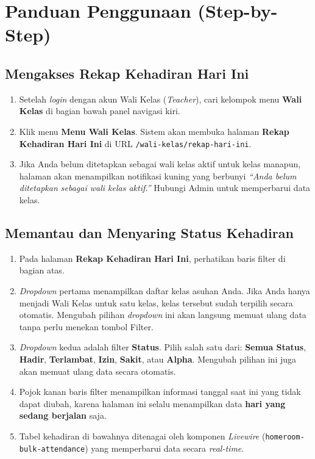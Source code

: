\section{Panduan Penggunaan (Step-by-Step)}

\subsection{Mengakses Rekap Kehadiran Hari Ini}
\begin{enumerate}
    \item Setelah \textit{login} dengan akun Wali Kelas (\textit{Teacher}), cari kelompok menu \textbf{Wali Kelas} di bagian bawah panel navigasi kiri.
    \item Klik menu \textbf{Menu Wali Kelas}. Sistem akan membuka halaman \textbf{Rekap Kehadiran Hari Ini} di URL \texttt{/wali-kelas/rekap-hari-ini}.
    \item Jika Anda belum ditetapkan sebagai wali kelas aktif untuk kelas manapun, halaman akan menampilkan notifikasi kuning yang berbunyi \textit{``Anda belum ditetapkan sebagai wali kelas aktif.''} Hubungi Admin untuk memperbarui data kelas.
\end{enumerate}

\subsection{Memantau dan Menyaring Status Kehadiran}
\begin{enumerate}
    \item Pada halaman \textbf{Rekap Kehadiran Hari Ini}, perhatikan baris filter di bagian atas.
    \item \textit{Dropdown} pertama menampilkan daftar kelas asuhan Anda. Jika Anda hanya menjadi Wali Kelas untuk satu kelas, kelas tersebut sudah terpilih secara otomatis. Mengubah pilihan \textit{dropdown} ini akan langsung memuat ulang data tanpa perlu menekan tombol Filter.
    \item \textit{Dropdown} kedua adalah filter \textbf{Status}. Pilih salah satu dari: \textbf{Semua Status}, \textbf{Hadir}, \textbf{Terlambat}, \textbf{Izin}, \textbf{Sakit}, atau \textbf{Alpha}. Mengubah pilihan ini juga akan memuat ulang data secara otomatis.
    \item Pojok kanan baris filter menampilkan informasi tanggal saat ini yang tidak dapat diubah, karena halaman ini selalu menampilkan data \textbf{hari yang sedang berjalan} saja.
    \item Tabel kehadiran di bawahnya ditenagai oleh komponen \textit{Livewire} (\texttt{homeroom-bulk-attendance}) yang memperbarui data secara \textit{real-time}.
\end{enumerate}

